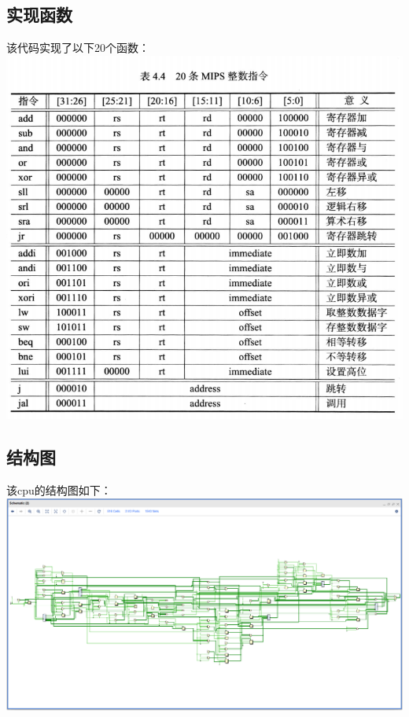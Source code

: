 \documentclass{article}
\newcommand{\tab}{\makebox[2em][l]{}}   %
\begin{document}
   \subsection{实现函数}
   \begin{flushleft}
   \tab 该代码实现了以下20个函数：\\
   \mbox{} \hfill{\includegraphics[scale=0.7]{2.png}}\hfill \mbox{}\\
   \end{flushleft}

   \subsection{结构图}
   \begin{flushleft}
   \tab 该cpu的结构图如下：\\
   \mbox{} \hfill{\includegraphics[scale=0.3]{11.png}}\hfill \mbox{}\\
   \end{flushleft}
\end{document}
